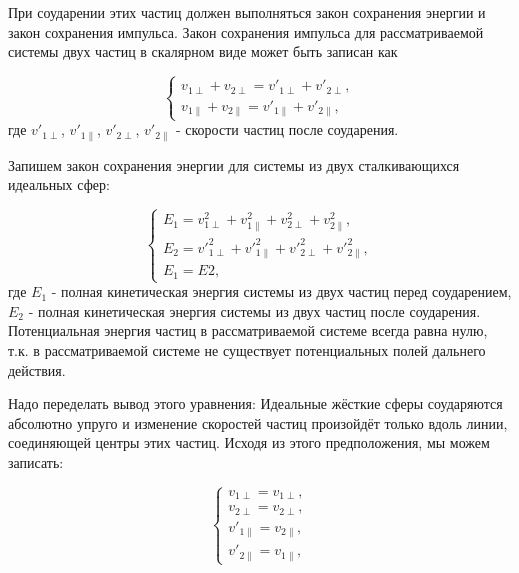 \documentclass{article}
\begin{document}
При соударении этих частиц должен выполняться закон сохранения энергии и закон сохранения импульса. Закон сохранения импульса для рассматриваемой системы двух частиц в скалярном виде  может быть записан как

\begin{equation}\label{eq:rule_of_contant_impulse}
    \begin{cases}
        v_{1\perp} + v_{2\perp} = v'_{1\perp} + v'_{2\perp},
        \\
        v_{1\parallel} + v_{2\parallel} = v'_{1\parallel} + v'_{2\parallel},
    \end{cases}
\end{equation}
где $ v'_{1\perp} $, $ v'_{1\parallel} $, $ v'_{2\perp} $, $ v'_{2\parallel} $ - скорости частиц после соударения.

Запишем закон сохранения энергии для системы из двух сталкивающихся идеальных сфер:

\begin{equation}\label{eq:rule_of_contant_energy}
    \begin{cases}
        E_1 = v^2_{1\perp} + v^2_{1\parallel} + v^2_{2\perp} + v^2_{2\parallel},
        \\
        E_2 = v'^2_{1\perp} + v'^2_{1\parallel} + v'^2_{2\perp} + v'^2_{2\parallel},
        \\
        E_1 = E2,
    \end{cases}
\end{equation}
где $ E_1 $ - полная кинетическая энергия системы из двух частиц перед соударением, $ E_2 $ - полная кинетическая энергия системы из двух частиц после соударения. Потенциальная энергия частиц в рассматриваемой системе всегда равна нулю, т.к. в рассматриваемой системе не существует потенциальных полей дальнего действия.

Надо переделать вывод этого уравнения:
Идеальные жёсткие сферы соударяются абсолютно упруго и изменение скоростей частиц произойдёт только вдоль линии, соединяющей центры этих частиц. Исходя из этого предположения, мы можем записать:

\begin{equation}\label{eq:new_velocities_after_collission}
    \begin{cases}
        v_{1\perp} = v_{1\perp},
        \\
        v_{2\perp} = v_{2\perp},
        \\
        v'_{1\parallel} = v_{2\parallel},
        \\
        v'_{2\parallel} = v_{1\parallel},
    \end{cases}
\end{equation}
\end{document}
